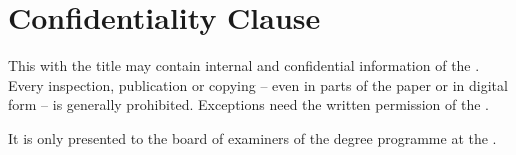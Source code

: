 
\chapter*{Confidentiality Clause}

\thispagestyle{empty}

This {\kind} with the title \textit{\myTitle} \textit{\mySubtitle} may contain internal and confidential information of the \company{}. Every inspection, publication or copying -- even in parts of the paper or in digital form -- is generally prohibited. Exceptions need the written permission of the \company{}.

It is only presented to the board of examiners of the degree programme \study at the \university{} \place{}.